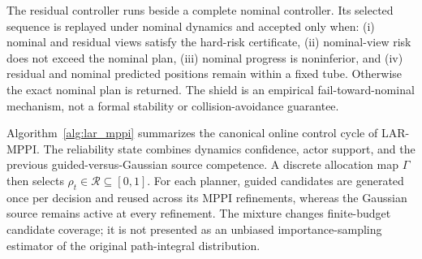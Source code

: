 \documentclass[conference]{IEEEtran}
\newcommand{\method}{LAR-MPPI}
\begin{document}
The residual controller runs beside a complete nominal controller. Its selected sequence is replayed under nominal dynamics and accepted only when: (i) nominal and residual views satisfy the hard-risk certificate, (ii) nominal-view risk does not exceed the nominal plan, (iii) nominal progress is noninferior, and (iv) residual and nominal predicted positions remain within a fixed tube. Otherwise the exact nominal plan is returned. The shield is an empirical fail-toward-nominal mechanism, not a formal stability or collision-avoidance guarantee.


Algorithm~\ref{alg:lar_mppi} summarizes the canonical online control
cycle of \method{}. The reliability state combines dynamics confidence,
actor support, and the previous guided-versus-Gaussian source competence.
A discrete allocation map $\Gamma$ then selects
$\rho_t\in\mathcal{R}\subseteq[0,1]$. For each planner, guided candidates are
generated once per decision and reused across its MPPI refinements, whereas
the Gaussian source remains active at every refinement. The mixture changes finite-budget
candidate coverage; it is not presented as an unbiased importance-sampling
estimator of the original path-integral distribution.
\end{document}

